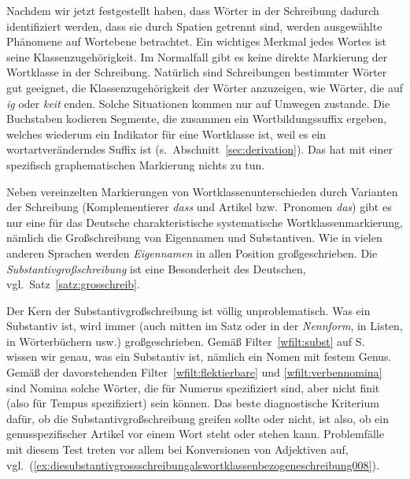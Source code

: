 
Nachdem wir jetzt festgestellt haben, dass Wörter in der Schreibung dadurch identifiziert werden, dass sie durch Spatien getrennt sind, werden ausgewählte Phänomene auf Wortebene betrachtet.
Ein wichtiges Merkmal jedes Wortes ist seine Klassenzugehörigkeit.
Im Normalfall gibt es keine direkte Markierung der Wortklasse in der Schreibung.
Natürlich sind Schreibungen bestimmter Wörter gut geeignet, die Klassenzugehörigkeit der Wörter anzuzeigen, wie \zB Wörter, die auf \textit{ig} oder \textit{keit} enden.
Solche Situationen kommen nur auf Umwegen zustande.
Die Buchstaben kodieren Segmente, die zusammen ein Wortbildungssuffix ergeben, welches wiederum ein Indikator für eine Wortklasse ist, weil es ein wortartveränderndes Suffix ist (s.\ Abschnitt~\ref{sec:derivation}).
Das hat mit einer spezifisch graphematischen Markierung nichts zu tun.

Neben vereinzelten Markierungen von Wortklassenunterschieden durch Varianten der Schreibung (Komplementierer \textit{dass} und Artikel bzw.\ Pronomen \textit{das}) gibt es nur eine für das Deutsche charakteristische systematische Wortklassenmarkierung, nämlich die Großschreibung von Eigennamen und Substantiven.
Wie in vielen anderen Sprachen werden \textit{Eigennamen} in allen Position großgeschrieben.
Die \textit{Substantivgroßschreibung} ist eine Besonderheit des Deutschen, vgl.\ Satz~\ref{satz:grosschreib}.


Der Kern der Substantivgroßschreibung ist völlig unproblematisch.
Was ein Substantiv ist, wird immer (auch mitten im Satz oder in der \textit{Nennform}, in Listen, in Wörterbüchern usw.) großgeschrieben.
Gemäß Filter~\ref{wfilt:subst} auf S.~\pageref{wfilt:subst} wissen wir genau, was ein Substantiv ist, nämlich ein Nomen mit festem Genus.
Gemäß der davorstehenden Filter~\ref{wfilt:flektierbare} und \ref{wfilt:verbennomina} sind Nomina solche Wörter, die für Numerus spezifiziert sind, aber nicht finit (also für Tempus spezifiziert) sein können.
Das beste diagnostische Kriterium dafür, ob die Substantivgroßschreibung greifen sollte oder nicht, ist also, ob ein genusspezifischer Artikel vor einem Wort steht oder stehen kann.
Problemfälle mit diesem Test treten vor allem bei Konversionen von Adjektiven auf, vgl.\ (\ref{ex:diesubstantivgrossschreibungalswortklassenbezogeneschreibung008}).

